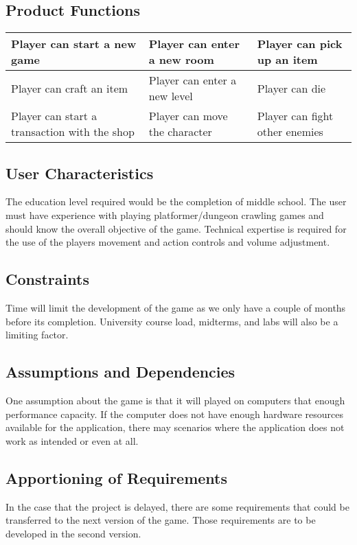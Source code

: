 \documentclass[12pt, titlepage]{article}
\begin{document}
  \subsection{Product Functions}
   \begin{center}
    \begin{tabular}{ | m{5em} | m{5em}| m{5em} | }
    \hline
    Player can start a new game & Player can enter a new room & Player can pick up an item \\
    \hline
    Player can craft an item & Player can enter a new level & Player can die \\
    \hline
    Player can start a transaction with the shop & Player can move the character & Player can fight other enemies \\
    \hline
    \end{tabular}
    \end{center}
  \subsection{User Characteristics}
  The education level required would be the completion of middle school. The user must have experience with playing platformer/dungeon crawling games and should know the overall objective of the game. Technical expertise is required for the use of the players movement and action controls and volume adjustment.
  \subsection{Constraints}
  Time will limit the development of the game as we only have a couple of months before its completion. University course load, midterms, and labs will also be a limiting factor.
  \subsection{Assumptions and Dependencies}
  One assumption about the game is that it will played on computers that enough performance capacity. If the computer does not have enough hardware resources available for the application, there may scenarios where the application does not work as intended or even at all.
  \subsection{Apportioning of Requirements}
  In the case that the project is delayed, there are some requirements that could be transferred to the next version of the game. Those requirements are to be developed in the second version.
\end{document}

